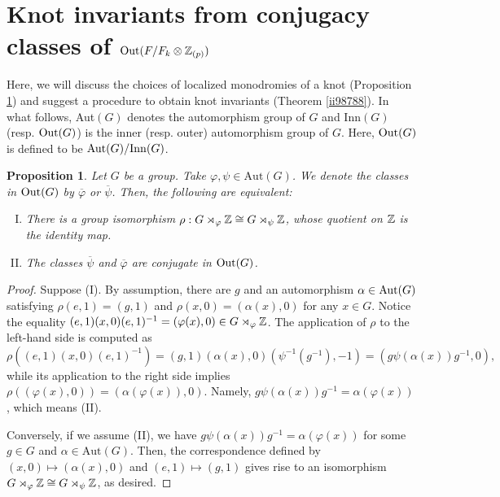 \documentclass{article}
\theoremstyle{plain}
\newtheorem{prop}[thm]{Proposition}
\theoremstyle{definition}
\newcommand{\Z}{{\Bbb Z}}
\newcommand{\Aut}{{\rm Aut}}
\newcommand{\Out}{{\rm Out}}
\begin{document}
{\section{Knot invariants from conjugacy classes of $\Out (F/F_k \otimes \Z_{(p)}) $}
\label{Ss4}
Here, we will discuss the choices of localized monodromies of a knot (Proposition \ref{ii9}) and suggest a procedure to obtain knot invariants (Theorem \ref{ii98788}). In what follows, Aut$(G)$ denotes the automorphism group of $G$ and $\mathrm{Inn}(G) $ (resp. $\Out(G)$) is the inner (resp. outer) automorphism group of $G$. Here, $\Out(G) $ is defined to be $\Aut(G) / \mathrm{Inn}(G) $.

\begin{prop}\label{ii9}
Let $G$ be a group. Take $\varphi, \psi \in \mathrm{Aut}(G)$. We denote the classes in $\Out (G)$ by $\overline{\varphi}$ or $ \overline{\psi}$. Then, the following are equivalent:

\begin{enumerate}[(I)]
\item There is a group isomorphism $\rho : G \rtimes_{\varphi} \Z \cong G \rtimes_\psi \Z$, whose quotient on $\Z$ is the identity map.
\item The classes $ \overline{\psi}$ and $\overline{\varphi}$ are conjugate in $\Out (G)$.
\end{enumerate}
\end{prop}

\begin{proof}
Suppose (I). By assumption, there are $g$ and an automorphism $ \alpha \in \Aut(G)$ satisfying $\rho (e ,1)= (g,1)$ and 
$ \rho( x,0)= (\alpha (x),0 )$ for any $x \in G$. Notice the equality $(e,1)(x,0)(e,1)^{-1}= (\varphi (x),0) \in G \rtimes_{\varphi} \Z $. The application of $\rho$ to the left-hand side is computed as
\[ \rho ( (e,1)(x,0)(e,1)^{-1})= (g,1)(\alpha(x),0)(\psi ^{-1}(g^{-1}),-1)= (g \psi(\alpha(x)) g^{-1},0), \]
while its application to the right side implies $ \rho( (\varphi (x),0) )= (\alpha(\varphi(x)) ,0)$. Namely, $g \psi(\alpha(x)) g^{-1} =\alpha(\varphi(x))$, which means (II).

Conversely, if we assume (II), we have $g \psi(\alpha(x)) g^{-1} =\alpha(\varphi(x))$ for some $g\in G$ and $\alpha \in \mathrm{Aut}(G) $. Then, the correspondence defined by $(x,0) \mapsto (\alpha(x),0)$ and $(e,1) \mapsto (g,1)$ gives rise to an isomorphism $ G \rtimes_{\varphi} \Z \cong G \rtimes_\psi \Z $, as desired.
\end{proof}

}
\end{document}
